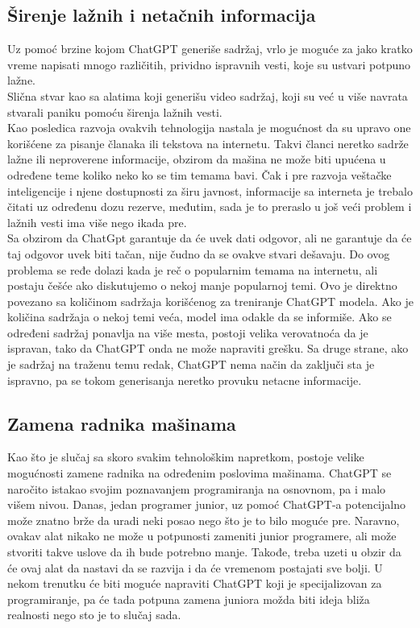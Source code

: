 \documentclass[fleqn, 12pt]{article}
\begin{document}
    \subsection{Širenje lažnih i netačnih informacija}
        \begin{text}
            Uz pomoć brzine kojom ChatGPT generiše sadržaj, vrlo je moguće za jako kratko vreme napisati mnogo različitih, prividno ispravnih vesti, koje su ustvari potpuno lažne\cite{G8}.
            \\
            Slična stvar kao sa alatima koji generišu video sadržaj, koji su već u više navrata stvarali paniku pomoću širenja lažnih vesti\cite{G8}.
            \\
            Kao posledica razvoja ovakvih tehnologija nastala je mogućnost da su upravo one korišćene za pisanje članaka ili tekstova na internetu. Takvi članci neretko sadrže lažne ili neproverene informacije, obzirom da mašina ne može biti upućena u određene teme koliko neko ko se tim temama bavi. Čak i pre razvoja veštačke inteligencije i njene dostupnosti za širu javnost, informacije sa interneta je trebalo čitati uz određenu dozu rezerve, međutim, sada je to preraslo u još veći problem i lažnih vesti ima više nego ikada pre\cite{G8}.
            \\
            Sa obzirom da ChatGpt garantuje da će uvek dati odgovor, ali ne garantuje da će taj odgovor uvek biti tačan, nije čudno da se ovakve stvari dešavaju. Do ovog problema se ređe dolazi kada je reč o popularnim temama na internetu, ali postaju češće ako diskutujemo o nekoj manje popularnoj temi. Ovo je direktno povezano sa količinom sadržaja korišćenog za treniranje ChatGPT modela. Ako je količina sadržaja o nekoj temi veća, model ima odakle da se informiše. Ako se određeni sadržaj ponavlja na više mesta, postoji velika verovatnoća da je ispravan, tako da ChatGPT onda ne može napraviti grešku. Sa druge strane, ako je sadržaj na traženu temu redak, ChatGPT nema način da zaključi sta je ispravno, pa se tokom generisanja neretko provuku netacne informacije\cite{G8}.
        \end{text}
\newpage
    \subsection{Zamena radnika mašinama}
        \begin{text}
            Kao što je slučaj sa skoro svakim tehnološkim napretkom, postoje velike mogućnosti zamene radnika na određenim poslovima mašinama. ChatGPT se naročito istakao svojim poznavanjem programiranja na osnovnom, pa i malo višem nivou. Danas, jedan programer junior, uz pomoć ChatGPT-a potencijalno može znatno brže da uradi neki posao nego što je to bilo moguće pre. Naravno, ovakav alat nikako ne može u potpunosti zameniti junior programere, ali može stvoriti takve uslove da ih bude potrebno manje. Takođe, treba uzeti u obzir da će ovaj alat da nastavi da se razvija i da će vremenom postajati sve bolji. U nekom trenutku će biti moguće napraviti ChatGPT koji je specijalizovan za programiranje, pa će tada potpuna zamena juniora možda biti ideja bliža realnosti nego sto je to slučaj sada\cite{G6}.
        \end{text}
\end{document}
